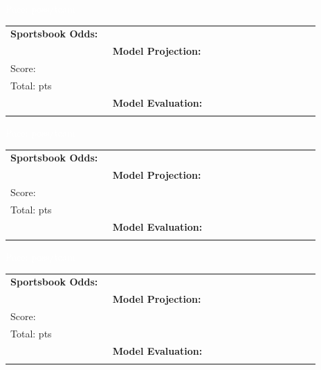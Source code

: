 \documentclass[10pt,a4paper]{article}
\begin{document}
\vspace{8pt}

\noindent\colorbox{matchupbar}{\parbox{\dimexpr\linewidth-2\fboxsep}{%
  \vspace{3pt}\hspace{4pt}{\bfseries\large\textcolor{white}{Utah Jazz @ Toronto Raptors}}
  \hfill{\small\textcolor{white}{Pace:  poss/team}}\vspace{3pt}
}}
\vspace{4pt}

\begin{tabular}{@{}p{0.32\linewidth}p{0.32\linewidth}p{0.33\linewidth}@{}}
\small
\textbf{Sportsbook Odds:} \\
&
\textbf{Model Projection:} \\
Score: \textbf{}\\
Total: \textbf{} pts\\
&
\textbf{Model Evaluation:} \\
\\
\end{tabular}

\vspace{8pt}

\noindent\colorbox{matchupbar}{\parbox{\dimexpr\linewidth-2\fboxsep}{%
  \vspace{3pt}\hspace{4pt}{\bfseries\large\textcolor{white}{Los Angeles Clippers @ Phoenix Suns}}
  \hfill{\small\textcolor{white}{Pace:  poss/team}}\vspace{3pt}
}}
\vspace{4pt}

\begin{tabular}{@{}p{0.32\linewidth}p{0.32\linewidth}p{0.33\linewidth}@{}}
\small
\textbf{Sportsbook Odds:} \\
&
\textbf{Model Projection:} \\
Score: \textbf{}\\
Total: \textbf{} pts\\
&
\textbf{Model Evaluation:} \\
\\
\end{tabular}

\vspace{8pt}

\noindent\colorbox{matchupbar}{\parbox{\dimexpr\linewidth-2\fboxsep}{%
  \vspace{3pt}\hspace{4pt}{\bfseries\large\textcolor{white}{Chicago Bulls @ Miami Heat}}
  \hfill{\small\textcolor{white}{Pace:  poss/team}}\vspace{3pt}
}}
\vspace{4pt}

\begin{tabular}{@{}p{0.32\linewidth}p{0.32\linewidth}p{0.33\linewidth}@{}}
\small
\textbf{Sportsbook Odds:} \\
&
\textbf{Model Projection:} \\
Score: \textbf{}\\
Total: \textbf{} pts\\
&
\textbf{Model Evaluation:} \\
\\
\end{tabular}

\vspace{8pt}
\end{document}
